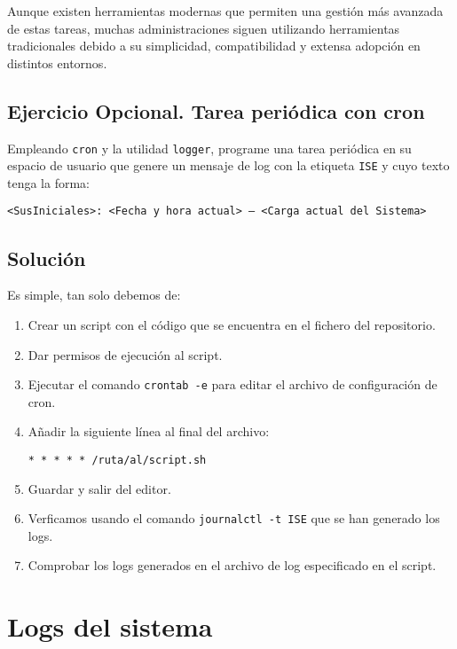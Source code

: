 Aunque existen herramientas modernas que permiten una gestión más avanzada de estas tareas, muchas administraciones siguen utilizando herramientas tradicionales debido a su simplicidad, compatibilidad y extensa adopción en distintos entornos.

\subsection{Ejercicio Opcional. Tarea periódica con cron}

Empleando \texttt{cron} y la utilidad \texttt{logger}, programe una tarea periódica en su espacio de usuario que genere un mensaje de log con la etiqueta \texttt{ISE} y cuyo texto tenga la forma:

\begin{center}
\texttt{<SusIniciales>: <Fecha y hora actual> – <Carga actual del Sistema>}
\end{center}

\subsection*{Solución}

Es simple, tan solo debemos de:
\begin{enumerate}
    \item Crear un script con el código que se encuentra en el fichero del repositorio.
    \item Dar permisos de ejecución al script.
    \item Ejecutar el comando \texttt{crontab -e} para editar el archivo de configuración de cron.
    \item Añadir la siguiente línea al final del archivo:
    \begin{lstlisting}[style=customstyle]   
* * * * * /ruta/al/script.sh
    \end{lstlisting}
    \item Guardar y salir del editor.
    \item Verficamos usando el comando \texttt{journalctl -t ISE} que se han generado los logs.
    \item Comprobar los logs generados en el archivo de log especificado en el script.
\end{enumerate}

\section{Logs del sistema}

